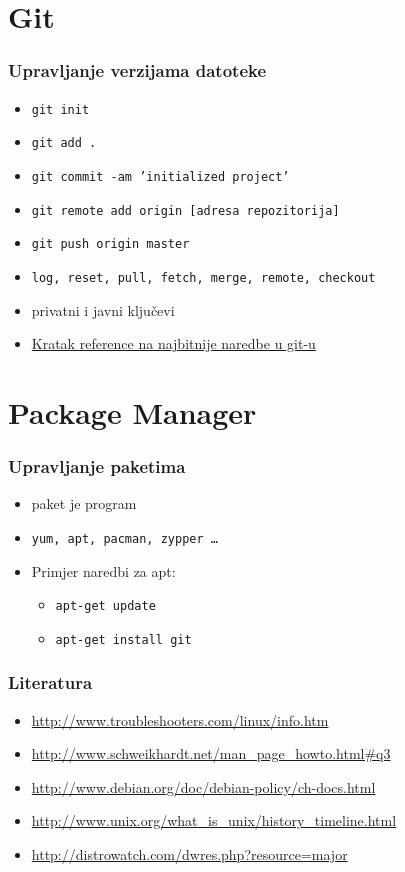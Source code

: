 \documentclass{beamer}
\begin{document}
\section{Git}
\begin{frame}[t]
\frametitle{Upravljanje verzijama datoteke}
\begin{itemize}
  \item \texttt{git init}
  \item \texttt{git add .}
  \item \texttt{git commit -am 'initialized project'}
	\item \texttt{git remote add origin [adresa repozitorija]}
	\item \texttt{git push origin master}

  \item \texttt{log, reset, pull, fetch, merge, remote, checkout}
  \item privatni i javni ključevi
  \item \href{http://rogerdudler.github.io/git-guide/}{Kratak reference na najbitnije naredbe u git-u}
\end{itemize}
\end{frame}

\section{Package Manager}
\begin{frame}[t]
\frametitle{Upravljanje paketima}
\begin{itemize}
  \item paket je program
  \item \texttt{yum, apt, pacman, zypper \ldots}
  \item Primjer naredbi za apt:
  \begin{itemize}
  	\item  \texttt{apt-get update}
	\item \texttt{apt-get install git}
  \end{itemize}
\end{itemize}
\end{frame}

\begin{frame}[t]
\frametitle{Literatura}
\begin{itemize}
  \item \url{http://www.troubleshooters.com/linux/info.htm}
  \item \url{http://www.schweikhardt.net/man_page_howto.html\#q3}
  \item \url{http://www.debian.org/doc/debian-policy/ch-docs.html}
  \item \url{http://www.unix.org/what_is_unix/history_timeline.html}
  \item \url{http://distrowatch.com/dwres.php?resource=major}
\end{itemize}
\end{frame}
\end{document}
